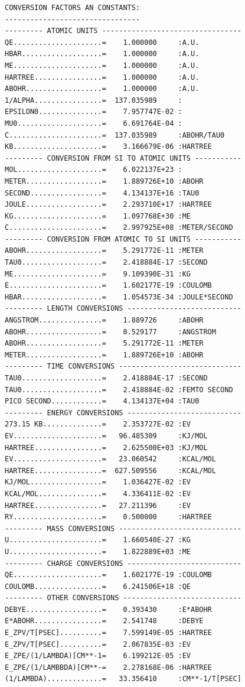 \documentclass[final,12pt,makeidx,DIV=calc]{article}
\begin{document}
{{{{{{\begin{verbatim}
CONVERSION FACTORS AN CONSTANTS:
--------------------------------
--------- ATOMIC UNITS ---------------------------------
QE.....................=    1.000000     :A.U.
HBAR...................=    1.000000     :A.U.
ME.....................=    1.000000     :A.U.
HARTREE................=    1.000000     :A.U.
ABOHR..................=    1.000000     :A.U.
1/ALPHA................=  137.035989     :
EPSILON0...............=    7.957747E-02 :
MU0....................=    6.691764E-04 :
C......................=  137.035989     :ABOHR/TAU0
KB.....................=    3.166679E-06 :HARTREE
--------- CONVERSION FROM SI TO ATOMIC UNITS -----------
MOL....................=    6.022137E+23 :
METER..................=    1.889726E+10 :ABOHR
SECOND.................=    4.134137E+16 :TAU0
JOULE..................=    2.293710E+17 :HARTREE
KG.....................=    1.097768E+30 :ME
C......................=    2.997925E+08 :METER/SECOND
--------- CONVERSION FROM ATOMIC TO SI UNITS -----------
ABOHR..................=    5.291772E-11 :METER
TAU0...................=    2.418884E-17 :SECOND
ME.....................=    9.109390E-31 :KG
E......................=    1.602177E-19 :COULOMB
HBAR...................=    1.054573E-34 :JOULE*SECOND
--------- LENGTH CONVERSIONS ---------------------------
ANGSTROM...............=    1.889726     :ABOHR
ABOHR..................=    0.529177     :ANGSTROM
ABOHR..................=    5.291772E-11 :METER
METER..................=    1.889726E+10 :ABOHR
--------- TIME CONVERSIONS -----------------------------
TAU0...................=    2.418884E-17 :SECOND
TAU0...................=    2.418884E-02 :FEMTO SECOND
PICO SECOND............=    4.134137E+04 :TAU0
--------- ENERGY CONVERSIONS ---------------------------
273.15 KB..............=    2.353727E-02 :EV
EV.....................=   96.485309     :KJ/MOL
HARTREE................=    2.625500E+03 :KJ/MOL
EV.....................=   23.060542     :KCAL/MOL
HARTREE................=  627.509556     :KCAL/MOL
KJ/MOL.................=    1.036427E-02 :EV
KCAL/MOL...............=    4.336411E-02 :EV
HARTREE................=   27.211396     :EV
RY.....................=    0.500000     :HARTREE
--------- MASS CONVERSIONS -----------------------------
U......................=    1.660540E-27 :KG
U......................=    1.822889E+03 :ME
--------- CHARGE CONVERSIONS ---------------------------
QE.....................=    1.602177E-19 :COULOMB
COULOMB................=    6.241506E+18 :QE
--------- OTHER CONVERSIONS ----------------------------
DEBYE..................=    0.393430     :E*ABOHR
E*ABOHR................=    2.541748     :DEBYE
E_ZPV/T[PSEC]..........=    7.599149E-05 :HARTREE
E_ZPV/T[PSEC]..........=    2.067835E-03 :EV
E_ZPE/(1/LAMBDA)[CM**-1=    6.199212E-05 :EV
E_ZPE/(1/LAMBBDA)[CM**-=    2.278168E-06 :HARTREE
(1/LAMBDA).............=   33.356410     :CM**-1/T[PSEC]


\end{verbatim}}}}}}}
\end{document}
